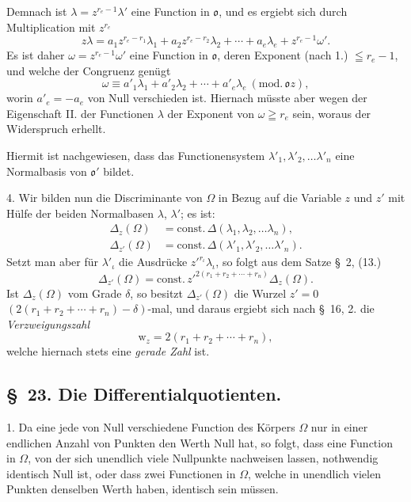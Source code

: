 \documentclass{article}
\begin{document}
Demnach ist $\lambda = z^{r_{e}-1}\lambda'$ eine Function in $\mathfrak{o}$, und es ergiebt sich durch Multiplication mit $z^{r_{e}}$
\[ z\lambda = a_{1}z^{r_{e}-r_{1}}\lambda_{1} + a_{2}z^{r_{e}-r_{2}}\lambda_{2} + \cdots + a_{e}\lambda_{e} + z^{r_{e}-1}\omega'. \]
Es ist daher $\omega = z^{r_{e}-1}\omega'$ eine Function in $\mathfrak{o}$, deren Exponent (nach 1.) $\leqq r_{e}-1$, und welche der Congruenz genügt
\[ \omega \equiv a'_{1}\lambda_{1} + a'_{2}\lambda_{2} + \cdots + a'_{e}\lambda_{e}\ (\text{mod.}\,\mathfrak{o}z), \]
worin $a'_{e} = -a_{e}$ von Null verschieden ist. Hiernach müsste aber wegen der Eigenschaft II. der Functionen $\lambda$ der Exponent von $\omega \geqq r_{e}$ sein, woraus der Widerspruch erhellt.

Hiermit ist nachgewiesen, dass das Functionensystem $\lambda'_{1}, \lambda'_{2}, \ldots \lambda'_{n}$ eine Normalbasis von $\mathfrak{o}'$ bildet.


4. Wir bilden nun die Discriminante von $\Omega$ in Bezug auf die Variable $z$ und $z'$ mit Hülfe der beiden Normalbasen $\lambda$, $\lambda'$; es ist:
\[ \begin{aligned} \Delta_{z}(\Omega) &= \text{const.}\,\Delta(\lambda_{1}, \lambda_{2}, \ldots \lambda_{n}), \\ \Delta_{z'}(\Omega) &= \text{const.}\,\Delta(\lambda'_{1}, \lambda'_{2}, \ldots \lambda'_{n}). \end{aligned} \]
Setzt man aber für $\lambda'_{\iota}$ die Ausdrücke $z'^{r_{\iota}}\lambda_{\iota}$, so folgt aus dem Satze §~2, (13.)
\[ \Delta_{z'}(\Omega) = \text{const.}\,z'^{2(r_{1}+r_{2}+\cdots+r_{n})}\Delta_{z}(\Omega). \]
Ist $\Delta_{z}(\Omega)$ vom Grade $\delta$, so besitzt $\Delta_{z'}(\Omega)$ die Wurzel $z' = 0$ $(2(r_{1}+r_{2}+\cdots+r_{n})-\delta)$-mal, und daraus ergiebt sich nach §~16, 2. die \emph{Verzweigungszahl}
\[ \mathrm{w}_{z} = 2(r_{1}+r_{2}+\cdots+r_{n}), \]
welche hiernach stets eine \emph{gerade Zahl} ist.

\subsection*{§~23. Die Differentialquotienten.}

1. Da eine jede von Null verschiedene Function des Körpers $\Omega$ nur in einer endlichen Anzahl von Punkten den Werth Null hat, so folgt, dass eine Function in $\Omega$, von der sich unendlich viele Nullpunkte nachweisen lassen, nothwendig identisch Null ist, oder dass zwei Functionen in $\Omega$, welche in unendlich vielen Punkten denselben Werth haben, identisch sein müssen.
\end{document}
